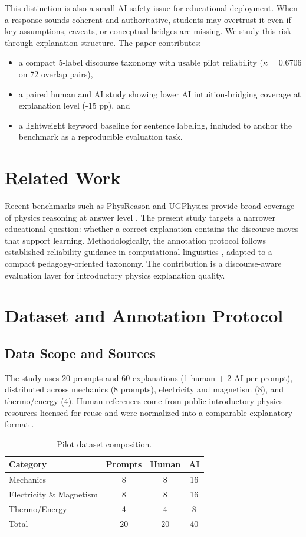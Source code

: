 \documentclass{article}
\begin{document}
This distinction is also a small AI safety issue for educational deployment. When a response sounds coherent and authoritative, students may overtrust it even if key assumptions, caveats, or conceptual bridges are missing. We study this risk through explanation structure. The paper contributes:
\begin{itemize}
\item a compact 5-label discourse taxonomy with usable pilot reliability ($\kappa=0.6706$ on 72 overlap pairs),
\item a paired human and AI study showing lower AI intuition-bridging coverage at explanation level (-15 pp), and
\item a lightweight keyword baseline for sentence labeling, included to anchor the benchmark as a reproducible evaluation task.
\end{itemize}

\section{Related Work}
Recent benchmarks such as PhysReason and UGPhysics provide broad coverage of physics reasoning at answer level \citep{physreason2025,ugphysics2025}. The present study targets a narrower educational question: whether a correct explanation contains the discourse moves that support learning. Methodologically, the annotation protocol follows established reliability guidance in computational linguistics \citep{cohen1960,landis1977,artstein2008}, adapted to a compact pedagogy-oriented taxonomy. The contribution is a discourse-aware evaluation layer for introductory physics explanation quality.

\section{Dataset and Annotation Protocol}
\subsection{Data Scope and Sources}
The study uses 20 prompts and 60 explanations (1 human + 2 AI per prompt), distributed across mechanics (8 prompts), electricity and magnetism (8), and thermo/energy (4). Human references come from public introductory physics resources licensed for reuse and were normalized into a comparable explanatory format \citep{openstaxlicense}.

\begin{table}[t]
\centering
\small
\begin{tabular}{lccc}
\toprule
Category & Prompts & Human & AI \\
\midrule
Mechanics & 8 & 8 & 16 \\
Electricity \& Magnetism & 8 & 8 & 16 \\
Thermo/Energy & 4 & 4 & 8 \\
\midrule
Total & 20 & 20 & 40 \\
\bottomrule
\end{tabular}
\caption{Pilot dataset composition.}
\label{tab:dataset}
\vspace{-0.6em}
\end{table}
\end{document}
